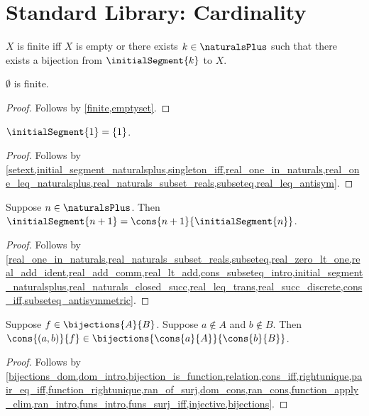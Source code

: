 \section{Standard Library: Cardinality}\label{form_sec_cardinality}

\begin{definition}\label{finite}
    $X$ is finite iff $X$ is empty or there exists $k \in \naturalsPlus$ such that
        there exists a bijection from $\initialSegment{k}$ to $X$.
\end{definition}

\begin{lemma} \label{emptyset_is_finite}
    $\emptyset$ is finite.
\end{lemma}
\begin{proof}
    Follows by \cref{finite,emptyset}.
\end{proof}

\begin{lemma}\label{initial_segment_one_library}
    $\initialSegment{1} = \{1\}$.
\end{lemma}
\begin{proof}
    Follows by \cref{setext,initial_segment_naturalsplus,singleton_iff,real_one_in_naturals,real_one_leq_naturalsplus,real_naturals_subset_reals,subseteq,real_leq_antisym}.
\end{proof}

\begin{lemma}\label{initial_segment_succ}
    Suppose $n\in\naturalsPlus$.
    Then $\initialSegment{n+1} = \cons{n+1}{\initialSegment{n}}$.
\end{lemma}
\begin{proof}
    Follows by \cref{real_one_in_naturals,real_naturals_subset_reals,subseteq,real_zero_lt_one,real_add_ident,real_add_comm,real_lt_add,cons_subseteq_intro,initial_segment_naturalsplus,real_naturals_closed_succ,real_leq_trans,real_succ_discrete,cons_iff,subseteq_antisymmetric}.
\end{proof}

\begin{lemma}\label{bijection_cons}
    Suppose $f\in\bijections{A}{B}$.
    Suppose $a\notin A$ and $b\notin B$.
    Then $\cons{(a,b)}{f}\in\bijections{\cons{a}{A}}{\cons{b}{B}}$.
\end{lemma}
\begin{proof}
    Follows by \cref{bijections_dom,dom_intro,bijection_is_function,relation,cons_iff,rightunique,pair_eq_iff,function_rightunique,ran_of_surj,dom_cons,ran_cons,function_apply_elim,ran_intro,funs_intro,funs_surj_iff,injective,bijections}.
\end{proof}

